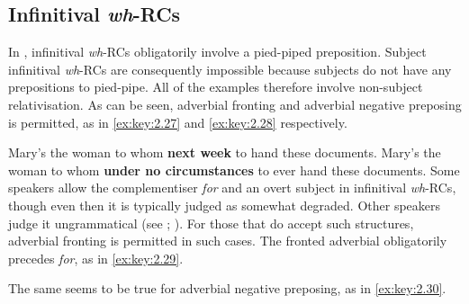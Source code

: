 \documentclass[output=paper]{langsci/langscibook}
\begin{document}
\ea\label{ex:key:2.25}
    \z
\z
\ea\label{ex:key:2.26}
    \z
\z

\subsection{Infinitival \emph{wh}-RCs}

In , infinitival \emph{wh}{-\glspl{RC} obligatorily involve a pied-piped
preposition.} Subject infinitival \emph{wh}{-\glspl{RC} are consequently impossible
because subjects do not have any prepositions to pied-pipe. All of the examples
therefore involve non-subject relativisation. As can be seen, adverbial
fronting} and adverbial negative preposing is permitted, as in \eqref{ex:key:2.27} and \eqref{ex:key:2.28}
respectively.

\ea\label{ex:key:2.27}
    Mary’s the woman to whom \textbf{next week} to hand these documents.
\z
\ea\label{ex:key:2.28}
    Mary’s the woman to whom \textbf{under no circumstances} to ever hand these documents.
\z
Some speakers allow the complementiser \emph{for} and an overt subject in
infinitival \emph{wh}{-RCs, though even then it is typically judged as somewhat
degraded. Other} speakers judge it ungrammatical (see
\citealt{ChomskyLasnik1977}; \citealt[1067]{Huddleston2002}). For those that do accept such
structures, adverbial fronting is permitted in such cases. The fronted
adverbial obligatorily precedes \emph{for}, as in \eqref{ex:key:2.29}.

\ea\label{ex:key:2.29}
    \z
\z
The same seems to be true for adverbial negative preposing, as in \eqref{ex:key:2.30}.

\ea\label{ex:key:2.30}
    \z
\z
\end{document}
